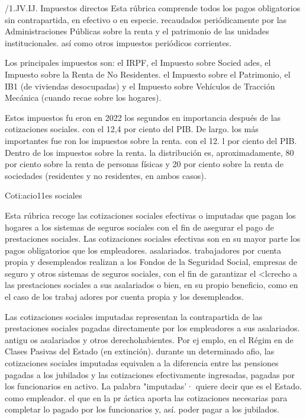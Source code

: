 \documentclass[10pt,a4paper]{article}
\begin{document}
/1.JV.IJ. Impuestos directos
Esta rúbrica comprende todos los pagos obligatorios sin contrapartida, en efectivo o en especie. recaudados periódicamente por las Administraciones Públicas sobre la renta y el patrimonio de las unidades institucionales. así como otros impuestos periódicos corrientes.

Los principales impuestos son: el IRPF, el Impuesto sobre Socied ades, el Impuesto sobre la Renta de No Residentes. el Impuesto sobre el Patrimonio, el IB1 (de viviendas desocupadas) y el Impuesto sobre Vehículos de Tracción Mecánica (cuando recae sobre los hogares).

Estos impuestos fu eron en 2022 los segundos en importancia después de las cotizaciones sociales. con el 12,4 por ciento del PIB. De largo. los más importantes fue ron los impuestos sobre la renta. con el 12. l por ciento del PIB. Dentro de los impuestos sobre la renta. la distribución es, aproximadamente, 80 por ciento sobre la renta de personas físicas y 20 por ciento sobre la renta de sociedades (residentes y no residentes, en ambos casos).

Coti:acio11es sociales

Esta rúbrica recoge las cotizaciones sociales efectivas o imputadas que pagan los hogares a los sistemas de seguros sociales con el fin de asegurar el pago de prestaciones sociales. Las cotizaciones sociales efectivas son en su mayor parte los pagos obligatorios que los empleadores. asalariados. trabajadores por cuenta propia y desempleados realizan a los Fondos de la Seguridad Social, empresas de seguro y otros sistemas de seguros sociales, con el fin de garantizar el <lcrecho a las prestaciones sociales a sus asalariados o bien, en su propio beneficio, como en el caso de los trabaj adores por cuenta propia y los desempleados.

Las cotizaciones sociales imputadas representan la contrapartida de las prestaciones sociales pagadas directamente por los empleadores a sus asalariados. antigu os asalariados y otros derechohabientes. Por ej emplo, en el Régim en de Clases Pasivas del Estado (en extinción). durante un determinado afio, las cotizaciones sociales imputadas equivalen a la diferencia entre las pensiones pagadas a los jubilados y las cotizaciones efectivamente ingresadas, pagadas por los funcionarios en activo. La palabra "imputadas'· quiere decir que es el Estado. como empleador. el que en la pr áctica aporta las cotizaciones necesarias para completar lo pagado por los funcionarios y, así. poder pagar a los jubilados.
\end{document}
